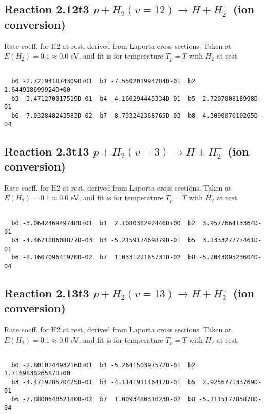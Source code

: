 \documentclass[12pt,dvipdfmx]{article}
\begin{document}
\newpage
\subsection{
Reaction 2.12t3
$ p + H_2(v=12) \rightarrow H + H_2^+$ (ion conversion)
}
Rate coeff. for H2 at rest, derived from Laporta cross sections.
Taken at $E(H_2) = 0.1 \approx 0.0$ eV,  and fit is for temperature $T_p=T$ with $H_2$ at rest.

\begin{small}\begin{verbatim}

  b0 -2.721941874309D+01  b1 -7.550201994784D-01  b2  1.644918699924D+00
  b3 -3.471270017519D-01  b4 -4.166294445334D-01  b5  2.720700818998D-01
  b6 -7.032848243583D-02  b7  8.733242368765D-03  b8 -4.309007010265D-04

\end{verbatim}\end{small}

\newpage
\subsection{
Reaction 2.3t13
$ p + H_2(v=3) \rightarrow H + H_2^+$ (ion conversion)
}
Rate coeff. for H2 at rest, derived from Laporta cross sections.
Taken at $E(H_2) = 0.1 \approx 0.0$ eV,  and fit is for temperature $T_p=T$ with $H_2$ at rest.

\begin{small}\begin{verbatim}

  b0 -3.064246949748D+01  b1  2.108038292446D+00  b2  3.957766413364D-01
  b3 -4.467108608877D-03  b4 -5.215917469879D-01  b5  3.133327777461D-01
  b6 -8.160709641970D-02  b7  1.033122165731D-02  b8 -5.204309523604D-04

\end{verbatim}\end{small}

\newpage
\subsection{
Reaction 2.13t3
$ p + H_2(v=13) \rightarrow H + H_2^+$ (ion conversion)
}
Rate coeff. for H2 at rest, derived from Laporta cross sections.
Taken at $E(H_2) = 0.1 \approx 0.0$ eV,  and fit is for temperature $T_p=T$ with $H_2$ at rest.

\begin{small}\begin{verbatim}

  b0 -2.801024493216D+01  b1 -5.264150397572D-01  b2  1.716983026587D+00
  b3 -4.471928570425D-01  b4 -4.114191146417D-01  b5  2.925677133769D-01
  b6 -7.880064852180D-02  b7  1.009348031023D-02  b8 -5.111517785878D-04

\end{verbatim}\end{small}
\end{document}
